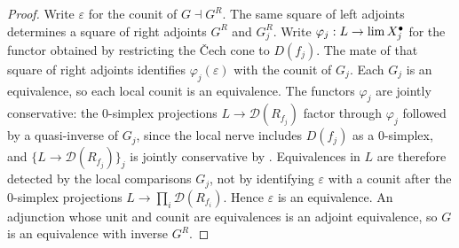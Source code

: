 \documentclass[11pt]{amsart}
\newcommand{\cD}{\mathcal{D}}
\renewcommand{\lim}{\operatornamewithlimits{\rm{lim}}}
\theoremstyle{plain}
\theoremstyle{definition}
\numberwithin{equation}{section}
\begin{document}
\begin{proof}
Write $\varepsilon$ for the counit of $G\dashv G^R$.
The same square of left adjoints determines a square of right adjoints $G^R$ and $G_j^R$.
Write $\varphi_j:L\to\lim X_j^\bullet$ for the functor obtained by restricting the \v Cech cone to $D(f_j)$.
The mate of that square of right adjoints identifies $\varphi_j(\varepsilon)$ with the counit of $G_j$.
Each $G_j$ is an equivalence, so each local counit is an equivalence.
The functors $\varphi_j$ are jointly conservative: the $0$-simplex projections $L\to\cD(R_{f_j})$ factor through $\varphi_j$ followed by a quasi-inverse of $G_j$, since the local nerve includes $D(f_j)$ as a $0$-simplex, and $\{L\to\cD(R_{f_j})\}_j$ is jointly conservative by .
Equivalences in $L$ are therefore detected by the local comparisons $G_j$, not by identifying $\varepsilon$ with a counit after the $0$-simplex projections $L\to\prod_i\cD(R_{f_i})$.
Hence $\varepsilon$ is an equivalence.
An adjunction whose unit and counit are equivalences is an adjoint equivalence, so $G$ is an equivalence with inverse $G^R$.
\end{proof}
\end{document}
